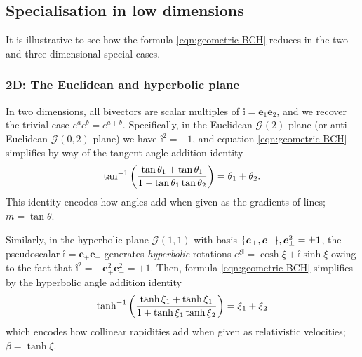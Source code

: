 \documentclass[12pt,a4paper]{article}
\makeatletter
\newcommand\x[1]{\@nameuse{\detokenize{#1}}}
\renewcommand{\vb}[1]{\boldsymbol{#1}}
\newcommand{\ve}[1]{\vb{e}_{#1}}
\newcommand{\GA}[1][]{\mathcal{G}_{#1}}
\newcommand{\vol}{\mathbb{i}}
\newcommand{\bch}[2]{#1 \circledcirc #2}
\makeatother
\begin{document}


\subsection{Specialisation in low dimensions}

It is illustrative to see how the \x{BCH} formula \eqref{eqn:geometric-BCH} reduces in the two- and three-dimensional special cases.

\subsubsection{2D: The Euclidean and hyperbolic plane}

In two dimensions, all bivectors are scalar multiples of $\vol = \ve1\ve2$, and we recover the trivial case $e^ae^b = e^{a+b}$. %
Specifically, in the Euclidean $\GA(2)$ plane (or anti-Euclidean $\GA(0,2)$ plane) we have $\vol^2 = -1$, and equation \eqref{eqn:geometric-BCH} simplifies by way of the tangent angle addition identity
\begin{align}
	\tan^{-1}\qty(\frac{\tan \theta_1 + \tan \theta_1}{1 - \tan \theta_1 \tan \theta_2}) = \theta_1 + \theta_2
.\end{align}
This identity encodes how angles add when given as the gradients of lines; $m = \tan \theta$.

Similarly, in the hyperbolic plane $\GA(1,1)$ with basis $\qty{\ve+, \ve-}, \ve\pm^2 = \pm1$, the pseudoscalar $\vol = \ve+\ve-$ generates \emph{hyperbolic} rotations $e^{\xi{}\vol} = \cosh \xi{} + \vol\sinh \xi{}$ owing to the fact that $\vol^2 = -\ve+^2\ve-^2 = +1$.
Then, formula \eqref{eqn:geometric-BCH} simplifies by the hyperbolic angle addition identity
\begin{align}
	\tanh^{-1}\qty(\frac{\tanh \xi{}_1 + \tanh \xi{}_1}{1 + \tanh \xi{}_1 \tanh \xi{}_2}) = \xi{}_1 + \xi{}_2
\end{align}
which encodes how collinear rapidities add when given as relativistic velocities; $\beta{} = \tanh \xi{}$.
\end{document}
